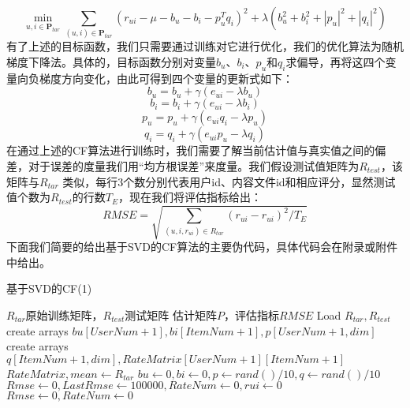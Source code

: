 \documentclass[bachelor]{seuthesis} %
\begin{document}
\begin{Main}
\begin{equation}
\min_{u,i\in\textbf{P}_{tar}}\sum_{(u,i)\in\textbf{P}_{tar}}(r_{ui}-\mu-b_u-b_i-p_u^Tq_i)^2+\lambda(b_u^2+b_i^2+|p_u|^2+|q_i|^2)
\end{equation}
有了上述的目标函数，我们只需要通过训练对它进行优化，我们的优化算法为随机梯度下降法。具体的，目标函数分别对变量$b_u$、$b_i$、$p_u$和$q_i$求偏导，再将这四个变量向负梯度方向变化，由此可得到四个变量的更新式如下：
\begin{equation}
b_u=b_u+\gamma(e_{ui}-\lambda b_u)
\end{equation}
\begin{equation}
b_i=b_i+\gamma(e_{ui}-\lambda b_i)
\end{equation}
\begin{equation}
p_u=p_u+\gamma(e_{ui}q_i-\lambda p_u)
\end{equation}
\begin{equation}
q_i=q_i+\gamma(e_{ui}p_u-\lambda q_i)
\end{equation}
在通过上述的CF算法进行训练时，我们需要了解当前估计值与真实值之间的偏差，对于误差的度量我们用“均方根误差”来度量。我们假设测试值矩阵为$R_{test}$，该矩阵与$R_{tar}$ 类似，每行3个数分别代表用户id、内容文件id和相应评分，显然测试值个数为$R_{test}$的行数$T_E$，现在我们将评估指标给出：
\begin{equation}
RMSE=\sqrt{\sum_{(u,i,r_{ui})\in R_{tar}}(r_{ui}-\hat{r}_{ui})^2/T_E}
\end{equation}
下面我们简要的给出基于SVD的CF算法的主要伪代码，具体代码会在附录或附件中给出。
\begin{algorithm}
    \caption{基于SVD的CF(1)}
    \begin{algorithmic}[1] %
        \Require $R_{tar}$原始训练矩阵，$R_{test}$测试矩阵
        \Ensure 估计矩阵$P$，评估指标$RMSE$
            \State Load $R_{tar},R_{test}$
            \State create arrays $bu[UserNum+1],bi[ItemNum+1],p[UserNum+1,dim]$
            \State create arrays $q[ItemNum+1,dim],RateMatrix[UserNum+1][ItemNum+1]$
            \State $RateMatrix,mean \gets R_{tar}$  
                \State $bu\gets0,bi\gets0,p\gets rand()/10,q\gets rand()/10$
            \EndFor      
        \EndFunction
        \State $Rmse\gets0,LastRmse\gets100000,RateNum\gets0,rui\gets0$
            \State $Rmse\gets0,RateNum\gets0$

\end{algorithmic}
\end{algorithm}
\end{Main}
\end{document}
